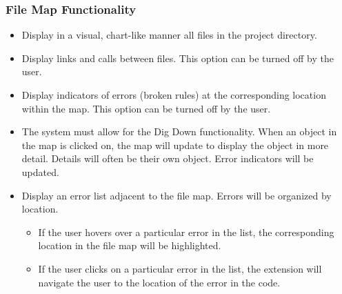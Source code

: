 \documentclass[letterpaper,10pt,titlepage,draftclsnofoot,onecolumn,onesided] {IEEEtran}
\begin{document}
\subsubsection{File Map Functionality}
\begin{itemize}
	\item Display in a visual, chart-like manner all files in the project directory.
    \item Display links and calls between files. This option can be turned off by the user.
    \item Display indicators of errors (broken rules) at the corresponding location within the map.
	 This option can be turned off by the user.
    \item The system must allow for the Dig Down functionality.
	 When an object in the map is clicked on, the map will update to display the object in more detail. Details will often be their own object.
	 Error indicators will be updated.
    \item Display an error list adjacent to the file map.
	 Errors will be organized by location.
    \begin{itemize}
    	\item If the user hovers over a particular error in the list, the corresponding location in the file map will be highlighted.
        \item If the user clicks on a particular error in the list, the extension will navigate the user to the location of the error in the code.
    \end{itemize}
\end{itemize}
\end{document}

